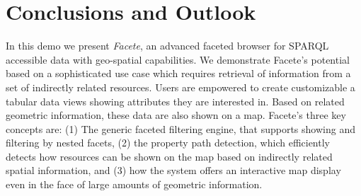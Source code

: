 






\section{Conclusions and Outlook}
\label{sec:conclusions}
In this demo we present \emph{Facete}, an advanced faceted browser
for SPARQL accessible data with geo-spatial capabilities.
We demonstrate Facete's potential based on a sophisticated use case
which requires retrieval of information from a set of
indirectly related resources. Users are empowered to create customizable a tabular data views showing attributes they are interested in. 
Based on related geometric information, these data are also shown on a map.
Facete's three key concepts are:
(1) The generic faceted filtering engine,
that supports showing and filtering by nested facets, (2) the property path
detection, which efficiently detects how resources can be shown on the map based
on indirectly related spatial information, and (3) how the system offers an
interactive map display even in the face of large amounts of geometric
information.

